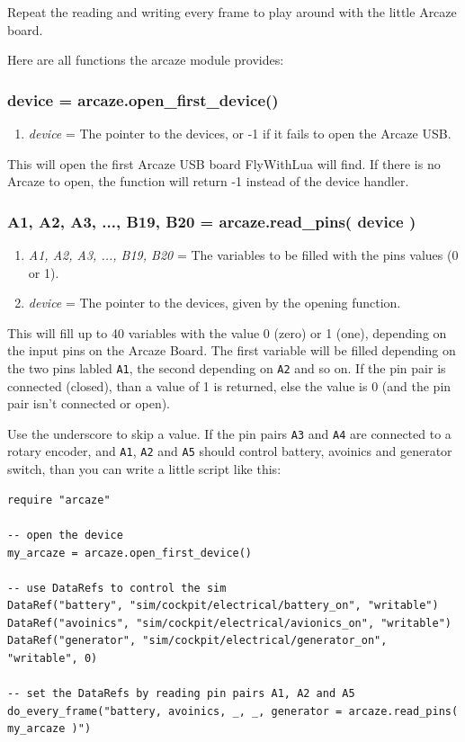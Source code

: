 \documentclass[11pt,parskip=half,a4paper]{scrartcl}
\begin{document}
Repeat the reading and writing every frame to play around with the little Arcaze board.

Here are all functions the arcaze module provides:

\subsubsection{device = arcaze.open\_first\_device()}

\begin{enumerate}
\item \emph{device} = The pointer to the devices, or -1 if it fails to open the Arcaze USB.
\end{enumerate}

This will open the first Arcaze USB board FlyWithLua will find. If there is no Arcaze to open, the function will return -1 instead of the device handler.

\subsubsection{A1, A2, A3, ..., B19, B20 = arcaze.read\_pins( device )}

\begin{enumerate}
\item \emph{A1, A2, A3, ..., B19, B20} = The variables to be filled with the pins values (0 or 1).
\item \emph{device} = The pointer to the devices, given by the opening function.
\end{enumerate}

This will fill up to 40 variables with the value 0 (zero) or 1 (one), depending on the input pins on the Arcaze Board. The first variable will be filled depending on the two pins labled \verb|A1|, the second depending on \verb|A2| and so on. If the pin pair is connected (closed), than a value of 1 is returned, else the value is 0 (and the pin pair isn't connected or open).

Use the underscore to skip a value. If the pin pairs \verb|A3| and \verb|A4| are connected to a rotary encoder, and \verb|A1|, \verb|A2| and \verb|A5| should control battery, avoinics and generator switch, than you can write a little script like this:

\begin{lstlisting}[firstnumber=1]
require "arcaze"

-- open the device
my_arcaze = arcaze.open_first_device()

-- use DataRefs to control the sim
DataRef("battery", "sim/cockpit/electrical/battery_on", "writable")
DataRef("avoinics", "sim/cockpit/electrical/avionics_on", "writable")
DataRef("generator", "sim/cockpit/electrical/generator_on", "writable", 0)

-- set the DataRefs by reading pin pairs A1, A2 and A5
do_every_frame("battery, avoinics, _, _, generator = arcaze.read_pins( my_arcaze )")
\end{lstlisting}
\end{document}
